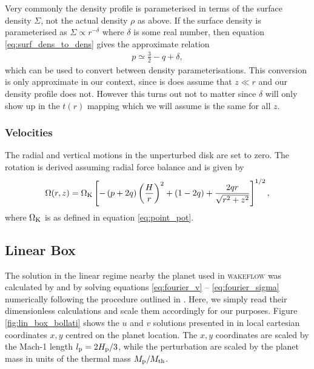 Very commonly the density profile is parameterised in terms of the surface density $\Sigma$, not the actual density $\rho$ as above.
If the surface density is parameterised as $\Sigma \propto r^{-\delta}$ where $\delta$ is some real number, then equation \ref{eq:surf_dens_to_dens} gives the approximate relation 
\begin{align}
    p \simeq \frac{3}{2} - q + \delta,
\end{align}
which can be used to convert between density parameterisations.
This conversion is only approximate in our context, since is does assume that $z \ll r$ and our density profile does not.
However this turns out not to matter since $\delta$ will only show up in the $t(r)$ mapping which we will assume is the same for all $z$.

\subsubsection{Velocities}

The radial and vertical motions in the unperturbed disk are set to zero. 
The rotation is derived assuming radial force balance \citep[eg.][]{nelson2013} and is given by 
\begin{align}
    \Omega(r,z) = \Omega_{\rm K} \left[ - \left(p + 2q\right) \left( \frac{H}{r} \right)^2 + \left( 1-2q \right) + \frac{2qr}{\sqrt{r^2 + z^2}}\right]^{1/2},
\end{align}
where $\Omega_{\rm K}$ is as defined in equation \ref{eq:point_pot}.

\subsection{Linear Box} \label{sec:linear_box}

The solution in the linear regime nearby the planet used in \textsc{wakeflow} was calculated by \citet{bollati2020} and \citet{bollati2021} by solving equations \ref{eq:fourier_v} -- \ref{eq:fourier_sigma} numerically following the procedure outlined in \citet{goodman2001}.
Here, we simply read their dimensionless calculations and scale them accordingly for our purposes. Figure \ref{fig:lin_box_bollati} shows the $u$ and $v$ solutions presented in \citet{bollati2021} in local cartesian coordinates $x,y$ centred on the planet location.
The $x,y$ coordinates are scaled by the Mach-1 length $l_{\rm p} = 2H_{\rm p}/3$, while the perturbation are scaled by the planet mass in units of the thermal mass $M_{\rm p} / M_{\rm th}$.

